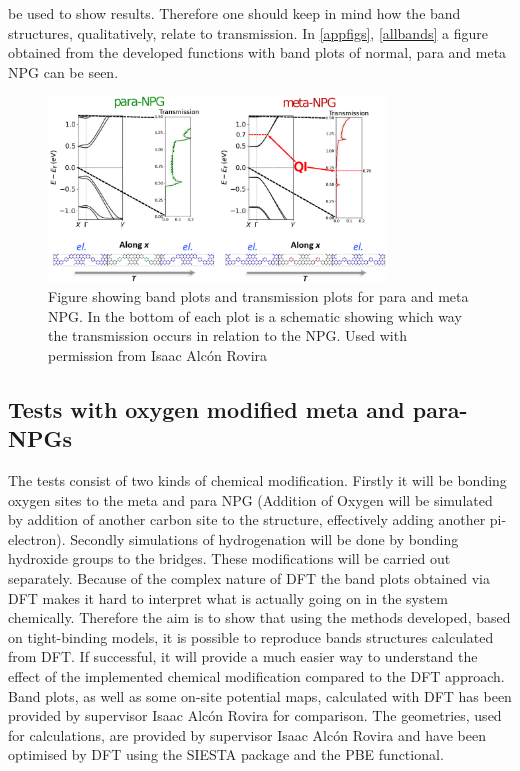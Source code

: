 be used to show results. Therefore one should keep in mind how the band structures, qualitatively, relate to transmission. In \cref{appfigs}, \cref{allbands} a figure obtained from the developed functions with band plots of normal, para and meta NPG can be seen.
\begin{figure}[ht]
	\centering
	\includegraphics[width=0.8\textwidth]{Figures/metapararesultdraft.eps}
	\caption{Figure showing band plots and transmission plots for para and meta NPG. In the bottom of each plot is a schematic showing which way the transmission occurs in relation to the NPG.\newline
	Used with permission from Isaac Alcón Rovira}
	\label{metapara}
\end{figure}
\newpage
\subsection{Tests with oxygen modified meta and para-NPGs}\label{testintroduc}
The tests consist of two kinds of chemical modification. Firstly it will be bonding oxygen sites to the meta and para NPG (Addition of Oxygen will be simulated by addition of another carbon site to the structure, effectively adding another pi-electron). Secondly simulations of hydrogenation will be done by bonding hydroxide groups to the bridges. These modifications will be carried out separately. Because of the complex nature of DFT the band plots obtained via DFT makes it hard to interpret what is actually going on in the system chemically. Therefore the aim is to show that using the methods developed, based on tight-binding models, it is possible to reproduce bands structures calculated from DFT. If successful, it will provide a much easier way to understand the effect of the implemented chemical modification compared to the DFT approach. Band plots, as well as some on-site potential maps, calculated with DFT has been provided by supervisor Isaac Alcón Rovira for comparison. The geometries, used for calculations, are provided by supervisor Isaac Alcón Rovira and have been optimised by DFT using the SIESTA package\cite{Soler_2002} and the PBE functional\cite{perdew1996a}.
